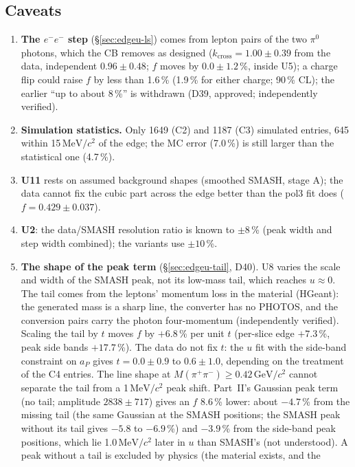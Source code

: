 \documentclass[11pt,a4paper]{article}
\newcommand{\piz}{\ensuremath{\pi^{0}}\xspace}
\newcommand{\Mpipi}{\ensuremath{M(\pi^{+}\pi^{-})}\xspace}
\newcommand{\GeVcc}{\ensuremath{\mathrm{GeV}/c^{2}}\xspace}
\newcommand{\MeVcc}{\ensuremath{\mathrm{MeV}/c^{2}}\xspace}
\newcommand{\aP}{\ensuremath{a_P}\xspace}
\begin{document}
\subsection{Caveats}
\label{sec:edgeu-cav}
\begin{enumerate}\setlength{\itemsep}{1pt}
\item \textbf{The $e^-e^-$ step} (\S\ref{sec:edgeu-ls}) comes from lepton pairs of the two \piz photons, which the CB removes as designed
      ($k_{\mathrm{cross}}=1.00\pm0.39$ from the data, independent $0.96\pm0.48$; $f$ moves by $0.0\pm1.2$\,\%, inside U5); a charge flip could
      raise $f$ by less than 1.6\,\% (1.9\,\% for either charge; 90\,\% CL); the earlier ``up to about 8\,\%'' is withdrawn (D39, approved;
      independently verified).
\item \textbf{Simulation statistics.} Only 1649 (C2) and 1187 (C3) simulated entries, 645 within 15\,\MeVcc of the edge; the MC error (7.0\,\%) is
      still larger than the statistical one (4.7\,\%).
\item \textbf{U11} rests on assumed background shapes (smoothed SMASH, stage A); the data cannot fix the cubic part across the edge better than the
      pol3 fit does ($f=0.429\pm0.037$).
\item \textbf{U2}: the data/SMASH resolution ratio is known to $\pm8$\,\% (peak width and step width combined); the variants use $\pm10$\,\%.
\item \textbf{The shape of the peak term} (\S\ref{sec:edgeu-tail}, D40). U8 varies the scale and width of the SMASH peak, not its low-mass
      tail, which reaches $u\approx0$. The tail comes from the leptons' momentum loss in the material (HGeant): the generated mass is a sharp
      line, the converter has no PHOTOS, and the conversion pairs carry the photon four-momentum (independently verified). Scaling the tail by
      $t$ moves $f$ by $+6.8$\,\% per unit $t$ (per-slice edge $+7.3$\,\%, peak side bands $+17.7$\,\%). The data do not fix $t$: the $u$ fit
      with the side-band constraint on \aP gives $t=0.0\pm0.9$ to $0.6\pm1.0$, depending on the treatment of the C4 entries. The line shape at
      $\Mpipi\ge0.42$\,\GeVcc cannot separate the tail from a 1\,\MeVcc peak shift. Part~II's Gaussian peak term (no tail; amplitude
      $2838\pm717$) gives an $f$ 8.6\,\% lower: about $-4.7$\,\% from the missing tail (the same Gaussian at the SMASH positions; the SMASH
      peak without its tail gives $-5.8$ to $-6.9$\,\%) and $-3.9$\,\% from the side-band peak positions, which
      lie 1.0\,\MeVcc later in $u$ than SMASH's (not understood). A peak without a tail is excluded by physics (the material exists, and the

\end{enumerate}
\end{document}
